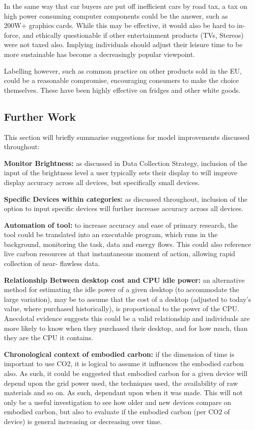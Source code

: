 \documentclass[conference]{IEEEtran}
\begin{document}
In the same way that car buyers are put off inefficient cars by road
tax, a tax on high power consuming computer components could be the
answer, such as 200W+ graphics cards. While this may be effective, it
would also be hard to in-force, and ethically questionable if other
entertainment products (TVs, Stereos) were not taxed also. Implying
individuals should adjust their leisure time to be more sustainable
has become a decreasingly popular viewpoint.

Labelling however, such as common practice on other products sold in
the EU, could be a reasonable compromise, encouraging consumers to
make the choice themselves. These have been highly effective on
fridges and other white goods.


\subsection{Further Work}

This section will briefly summarise suggestions for model improvements
discussed throughout:

{\textbf{Monitor Brightness:}} as discussed in Data Collection Strategy,
inclusion of the input of the brightness level a user typically sets
their display to will improve display accuracy across all devices, but
specifically small devices.

{\textbf{Specific Devices within categories:}} as discussed throughout,
inclusion of the option to input specific devices will further
increase accuracy across all devices.

{\textbf{Automation of tool:}} to increase accuracy and ease of primary
research, the tool could be translated into an executable program,
which runs in the background, monitoring the task, data and energy
flows. This could also reference live carbon resources at that
instantaneous moment of action, allowing rapid collection of near-
flawless data.

{\textbf{Relationship Between desktop cost and CPU idle power:}} an
alternative method for estimating the idle power of a given desktop
(to accommodate the large variation), may be to assume that the cost
of a desktop (adjusted to today’s value, where purchased
historically), is proportional to the power of the CPU. Anecdotal
evidence suggests this could be a valid relationship and individuals
are more likely to know when they purchased their desktop, and for how
much, than they are the CPU it contains.

{\textbf{Chronological context of embodied carbon:}} if the dimension
of time is important to use CO2, it is logical to assume it influences
the embodied carbon also. As such, it could be suggested that embodied
carbon for a given device will depend upon the grid power used, the
techniques used, the availability of raw materials and so on. As such,
dependant upon when it was made. This will not only be a useful
investigation to see how older and new devices compare on embodied
carbon, but also to evaluate if the embodied carbon (per CO2 of
device) is general increasing or decreasing over time.
\end{document}
